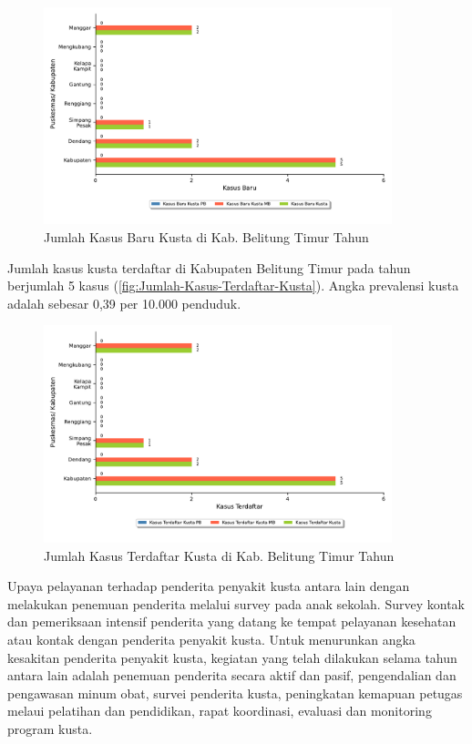 \begin{figure}[H]
  \centering
  \includegraphics[width=0.9\textwidth]{bab_06/bab_06_06a_kasusBaruKusta}
  \caption{Jumlah Kasus Baru Kusta di Kab. Belitung Timur Tahun \tP}
  \label{fig:Jumlah-Kasus-Baru-Kusta}
\end{figure}

Jumlah kasus kusta terdaftar di Kabupaten Belitung Timur pada tahun \tP berjumlah 5 kasus (\autoref{fig:Jumlah-Kasus-Terdaftar-Kusta}).
Angka prevalensi kusta adalah sebesar 0,39 per 10.000 penduduk.

\begin{figure}[H]
	\centering
	\includegraphics[width=0.9\textwidth]{bab_06/bab_06_06b_kasusTerdaftarKusta}
	\caption{Jumlah Kasus Terdaftar Kusta di Kab. Belitung Timur Tahun \tP}
	\label{fig:Jumlah-Kasus-Terdaftar-Kusta}
\end{figure}

Upaya pelayanan terhadap penderita penyakit kusta antara lain dengan melakukan penemuan penderita melalui survey pada anak sekolah.
Survey kontak dan pemeriksaan intensif penderita yang datang ke tempat pelayanan kesehatan atau kontak dengan penderita penyakit kusta.
Untuk menurunkan angka kesakitan penderita penyakit kusta, kegiatan yang telah dilakukan selama tahun \tP antara lain adalah penemuan penderita secara aktif dan pasif, pengendalian dan pengawasan minum obat, survei penderita kusta, peningkatan kemapuan petugas melaui pelatihan dan pendidikan, rapat koordinasi, evaluasi dan monitoring program kusta.

